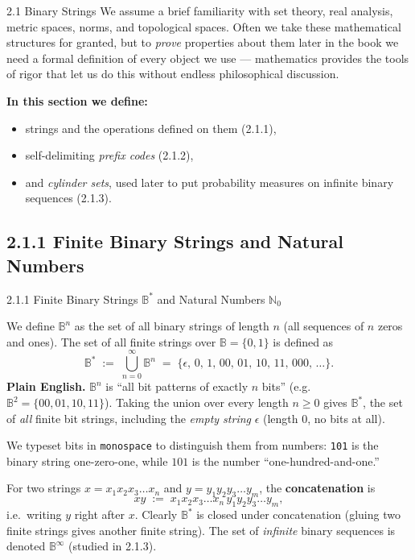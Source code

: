 \documentclass[aspectratio=169,10pt]{beamer}
\newcommand{\Bs}{\mathbb{B}^{*}}
\newcommand{\Binf}{\mathbb{B}^{\infty}}
\newcommand{\Bb}{\mathbb{B}}
\begin{document}
\begin{frame}{2.1 Binary Strings}
We assume a brief familiarity with set theory, real analysis, metric
spaces, norms, and topological spaces. Often we take these mathematical
structures for granted, but to \emph{prove} properties about them later in
the book we need a formal definition of every object we use --- mathematics
provides the tools of rigor that let us do this without endless
philosophical discussion.

\vspace{0.4cm}
\textbf{In this section we define:}
\begin{itemize}
  \item strings and the operations defined on them (2.1.1),
  \item self-delimiting \emph{prefix codes} (2.1.2),
  \item and \emph{cylinder sets}, used later to put probability measures on
    infinite binary sequences (2.1.3).
\end{itemize}
\end{frame}

\subsection{2.1.1 Finite Binary Strings and Natural Numbers}

\begin{frame}{2.1.1 Finite Binary Strings $\Bs$ and Natural Numbers $\mathbb{N}_0$}

We define $\Bb^n$ as the set of all binary strings of length $n$ (all
sequences of $n$ zeros and ones). The set of all finite strings over
$\Bb=\{0,1\}$ is defined as
\[
  \Bs \;:=\; \bigcup_{n=0}^{\infty}\Bb^{n} \;=\;
  \{\epsilon,\, 0,\, 1,\, 00,\, 01,\, 10,\, 11,\, 000,\, \dots\}.
\]
\textbf{Plain English.} $\Bb^n$ is ``all bit patterns of exactly $n$ bits''
(e.g.\ $\Bb^2=\{00,01,10,11\}$). Taking the union over every length $n\geq0$
gives $\Bs$, the set of \emph{all} finite bit strings, including the
\emph{empty string} $\epsilon$ (length $0$, no bits at all).

\medskip
We typeset bits in \texttt{monospace} to distinguish them from numbers:
\texttt{101} is the binary string one-zero-one, while $101$ is the number
``one-hundred-and-one.''

\medskip
For two strings $x=x_1x_2x_3\dots x_n$ and $y=y_1y_2y_3\dots y_m$, the
\textbf{concatenation} is
\[
  xy \;:=\; x_1x_2x_3\dots x_n\, y_1y_2y_3\dots y_m ,
\]
i.e.\ writing $y$ right after $x$. Clearly $\Bs$ is closed under
concatenation (gluing two finite strings gives another finite string). The
set of \emph{infinite} binary sequences is denoted $\Binf$ (studied in
2.1.3).
\end{frame}
\end{document}
